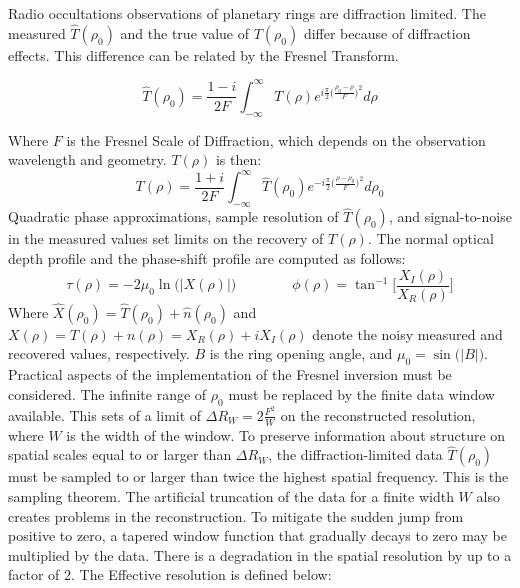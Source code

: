 \documentclass{article}
\begin{document}
            \noindent Radio occultations observations of planetary rings are diffraction limited. The measured $\hat{T}(\rho_0)$ and the true value of $T(\rho_0)$ differ because of diffraction effects. This difference can be related by the Fresnel Transform.
            
            \begin{equation*}
                \hat{T}(\rho_0) = \frac{1-i}{2F}\int_{-\infty}^{\infty} T(\rho)e^{i\frac{\pi}{2}\big(\frac{\rho_0-\rho}{F}\big)^2}d\rho
            \end{equation*}
            
            \noindent Where $F$ is the Fresnel Scale of Diffraction, which depends on the observation wavelength and geometry. $T(\rho)$ is then:
            \begin{equation}
            T(\rho) = \frac{1+i}{2F}\int_{-\infty}^{\infty}\hat{T}(\rho_0)e^{-i\frac{\pi}{2}\big(\frac{\rho-\rho_0}{F}\big)^2}d\rho_{0}
            \end{equation}
            Quadratic phase approximations, sample resolution of $\hat{T}(\rho_0)$, and signal-to-noise in the measured values set limits on the recovery of $T(\rho)$. The normal optical depth profile and the phase-shift profile are computed as follows:
            \begin{equation*}
                \tau(\rho) = -2\mu_{0}\ln\big(|X(\rho)|\big) \quad\quad\quad\quad \phi(\rho) = \tan^{-1}\bigg[\frac{X_{I}(\rho)}{X_{R}(\rho)}\bigg]
            \end{equation*}
            Where $\hat{X}(\rho_0) = \hat{T}(\rho_0) + \hat{n}(\rho_0)$ and $X(\rho) = T(\rho)+n(\rho) = X_{R}(\rho)+iX_{I}(\rho)$ denote the noisy measured and recovered values, respectively. $B$ is the ring opening angle, and $\mu_0 = \sin\big(|B|\big)$. Practical aspects of the implementation of the Fresnel inversion must be considered. The infinite range of $\rho_0$ must be replaced by the finite data window available. This sets of a limit of $\Delta R_{W} = 2\frac{F^2}{W}$ on the reconstructed resolution, where $W$ is the width of the window. To preserve information about structure on spatial scales equal to or larger than $\Delta R_{W}$, the diffraction-limited data $\hat{T}(\rho_0)$ must be sampled to or larger than twice the highest spatial frequency. This is the sampling theorem. The artificial truncation of the data for a finite width $W$ also creates problems in the reconstruction. To mitigate the sudden jump from positive to zero, a tapered window function that gradually decays to zero may be multiplied by the data. There is a degradation in the spatial resolution by up to a factor of $2$. The Effective resolution is defined below:
\end{document}
